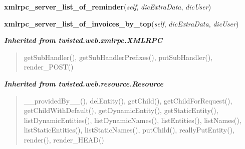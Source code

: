     \label{cuon:Report:Report:xmlrpc_server_list_of_reminder}

    \vspace{0.5ex}

\hspace{.8\funcindent}\begin{boxedminipage}{\funcwidth}

    \raggedright \textbf{xmlrpc\_server\_list\_of\_reminder}(\textit{self}, \textit{dicExtraData}, \textit{dicUser})

\setlength{\parskip}{2ex}
\setlength{\parskip}{1ex}
    \end{boxedminipage}

    \label{cuon:Report:Report:xmlrpc_server_list_of_invoices_by_top}

    \vspace{0.5ex}

\hspace{.8\funcindent}\begin{boxedminipage}{\funcwidth}

    \raggedright \textbf{xmlrpc\_server\_list\_of\_invoices\_by\_top}(\textit{self}, \textit{dicExtraData}, \textit{dicUser})

\setlength{\parskip}{2ex}
\setlength{\parskip}{1ex}
    \end{boxedminipage}


\large{\textbf{\textit{Inherited from twisted.web.xmlrpc.XMLRPC}}}

\begin{quote}
getSubHandler(), getSubHandlerPrefixes(), putSubHandler(), render\_POST()
\end{quote}

\large{\textbf{\textit{Inherited from twisted.web.resource.Resource}}}

\begin{quote}
\_\_providedBy\_\_(), delEntity(), getChild(), getChildForRequest(), getChildWithDefault(), getDynamicEntity(), getStaticEntity(), listDynamicEntities(), listDynamicNames(), listEntities(), listNames(), listStaticEntities(), listStaticNames(), putChild(), reallyPutEntity(), render(), render\_HEAD()
\end{quote}

